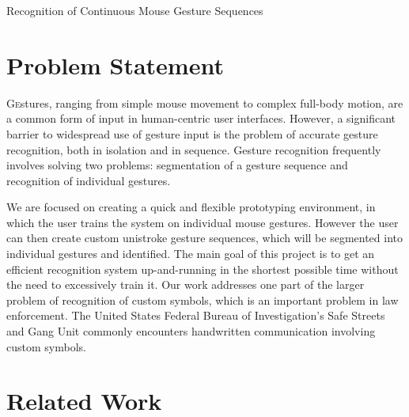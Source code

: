 \documentclass[twoside]{article}
\begin{document}
\centerline{Recognition of Continuous Mouse Gesture Sequences}
\normalsize


\begin{multicols}{2} %

\section{Problem Statement}
\lettrine[nindent=0em,lines=2]{G}estures, ranging from simple mouse movement to
complex full-body motion, are a common form of input in human-centric user
interfaces\cite{mitra_gesture_2007}. However, a significant barrier to
widespread use of gesture input is the problem of accurate gesture recognition,
both in isolation and in sequence. Gesture recognition frequently involves
solving two problems: segmentation of a gesture sequence and recognition of
individual gestures.

We are focused on creating a quick and flexible prototyping environment, in which the user
trains the system on individual mouse gestures. However the user can then create custom unistroke
gesture sequences, which will be segmented into individual gestures and identified. The main goal
of this project is to get an efficient recognition system up-and-running in the 
shortest possible time without the need to excessively train it. 
Our work addresses one part of the larger problem of recognition of custom 
symbols, which is an important problem in law enforcement. The United States 
Federal Bureau of Investigation's Safe Streets and Gang Unit commonly encounters 
handwritten communication involving custom symbols\cite{lyddane_donald_united_2006}. 

\section{Related Work}


\end{multicols}
\end{document}
